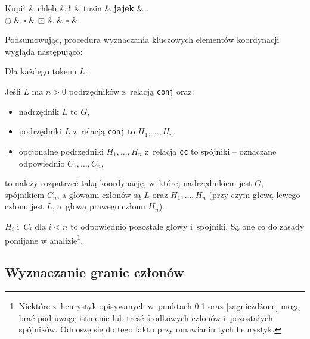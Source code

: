\begin{exe}
\ex \label{C}
\begin{dependency}[baseline=0.9ex]
\begin{deptext}[column sep=1em, row sep=.1ex]
Kupił \& chleb \& \textbf{i} \& tuzin \& \textbf{jajek} \& .  \\ 
$\odot$ \& $\square$ \& \textbf{$\boxdot$} \& \& $\square$ \& \\ 
\end{deptext}
\end{dependency}
\end{exe}

Podsumowując, procedura wyznaczania kluczowych elementów koordynacji wygląda następująco:

\begin{exe}
\ex 	\label{procedura}
Dla każdego tokenu $L$:

Jeśli $L$ ma $n>0$ podrzędników z~relacją \texttt{conj} oraz:

\begin{itemize}
\item nadrzędnik $L$ to $G$,
\item podrzędniki $L$ z~relacją \texttt{conj} to $H_{1}, \ldots , H_{n}$,
\item opcjonalne podrzędniki $H_{1}, \ldots , H_{n}$ z~relacją \texttt{cc} to spójniki -- oznaczane odpowiednio $C_{1}, \ldots , C_{n}$,
\end{itemize}

to należy rozpatrzeć taką koordynację, w~której nadrzędnikiem jest $G$, spójnikiem $C_{n}$, a głowami członów są $L$ oraz $H_{1}, \ldots , H_{n}$ (przy czym głową lewego członu jest $L$, a~głową prawego członu $H_{n}$).
\end{exe}

$H_{i}$ i~$C_{i}$ dla $i<n$ to odpowiednio pozostałe głowy i~spójniki. Są one co do zasady pomijane w analizie\footnote{
Niektóre z~heurystyk opisywanych w~punktach \ref{heurystyki} oraz \ref{zagnieżdżone} mogą brać pod uwagę istnienie lub treść środkowych członów i~pozostałych spójników. Odnoszę się do tego faktu przy omawianiu tych heurystyk.}.

\subsection{Wyznaczanie granic członów} \label{heurystyki}

